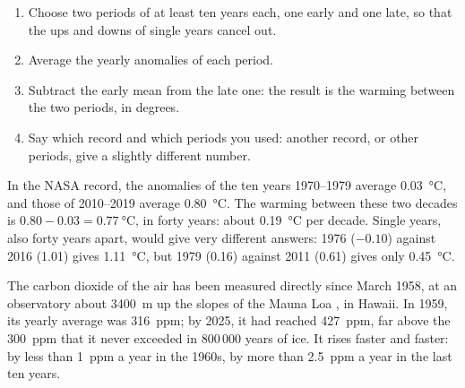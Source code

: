 \begin{method}
\begin{enumerate}
  \item Choose two periods of at least ten years each, one early and one
        late, so that the ups and downs of single years cancel out.
  \item Average the yearly anomalies of each period.
  \item Subtract the early mean from the late one: the result is the
        warming between the two periods, in degrees.
  \item Say which record and which periods you used: another record, or
        other periods, give a slightly different number.
\end{enumerate}
\end{method}

\begin{example}
In the NASA record, the anomalies of the ten years 1970--1979 average
\qty{0.03}{\degreeCelsius}, and those of 2010--2019 average
\qty{0.80}{\degreeCelsius}. The warming between these two decades is
$0.80 - 0.03 = \qty{0.77}{\degreeCelsius}$, in forty years: about
\qty{0.19}{\degreeCelsius} per decade. Single years, also forty years
apart, would give very different answers: 1976 ($-0.10$) against 2016
(1.01) gives \qty{1.11}{\degreeCelsius}, but 1979 (0.16) against 2011
(0.61) gives only \qty{0.45}{\degreeCelsius}.
\end{example}

The carbon dioxide of the air has been measured directly since March 1958,
at an observatory about \qty{3400}{m} up the slopes of the Mauna Loa
, in Hawaii. In 1959, its yearly average was \qty{316}{ppm}; by
2025, it had reached \qty{427}{ppm}, far above the \qty{300}{ppm} that it
never exceeded in 800\,000 years of ice. It rises faster and faster: by
less than \qty{1}{ppm} a year in the 1960s, by more than \qty{2.5}{ppm} a
year in the last ten years.

